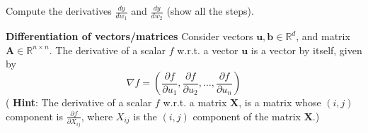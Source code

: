 \documentclass[solution,addpoints,12pt]{exam}
\begin{document}
\begin{questions}
          Compute the derivatives $\frac{dy}{dw_1}$ and $\frac{dy}{dw_2}$ (show all the steps).

          \begin{solution}
          \vspace*{70mm}
          \end{solution}
          
\question \textbf{Differentiation of vectors/matrices}
          \newline
          Consider vectors $\boldsymbol{u,b} \in \mathbb{R}^d$, and matrix $\boldsymbol{A} \in \mathbb{R}^{n \times n}$.
          \newline
          The derivative of a scalar $f$ w.r.t. a vector $\boldsymbol{u}$ is a vector by itself, given by
          \[
            \nabla f = \left( \frac{\partial f}{\partial u_1}, \frac{\partial f}{\partial u_2}, \dots, 
                         \frac{\partial f}{\partial u_n} 
                       \right)
          \]
          \newline
         ( \textbf{Hint}:  The derivative of a scalar $f$ w.r.t. a matrix $\boldsymbol{X}$, is a matrix whose $(i,j)$ component is $\frac{\partial f}{\partial X_{ij}}$, where $X_{ij}$ is the $(i,j)$ component of the matrix $\boldsymbol{X}$.)
         \newline
\end{questions}
\end{document}

